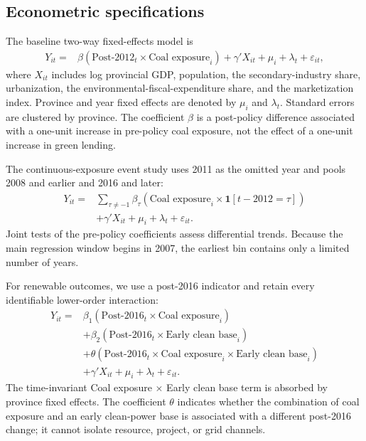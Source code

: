 \documentclass[11pt]{article}
\begin{document}
\subsection{Econometric specifications}

The baseline two-way fixed-effects model is
\begin{equation}
\begin{aligned}
Y_{it}={}&\beta(\text{Post-2012}_{t}\times\text{Coal exposure}_{i})
+\gamma'X_{it}+\mu_i+\lambda_t+\varepsilon_{it},
\end{aligned}
\label{eq:did}
\end{equation}
where $X_{it}$ includes log provincial GDP, population, the secondary-industry share, urbanization, the environmental-fiscal-expenditure share, and the marketization index. Province and year fixed effects are denoted by $\mu_i$ and $\lambda_t$. Standard errors are clustered by province. The coefficient $\beta$ is a post-policy difference associated with a one-unit increase in pre-policy coal exposure, not the effect of a one-unit increase in green lending.

The continuous-exposure event study uses 2011 as the omitted year and pools 2008 and earlier and 2016 and later:
\begin{equation}
\begin{aligned}
Y_{it}={}&\sum_{\tau\neq -1}\beta_{\tau}
\left(\text{Coal exposure}_{i}\times\mathbf{1}[t-2012=\tau]\right)\\
&+\gamma'X_{it}+\mu_i+\lambda_t+\varepsilon_{it}.
\end{aligned}
\label{eq:event}
\end{equation}
Joint tests of the pre-policy coefficients assess differential trends. Because the main regression window begins in 2007, the earliest bin contains only a limited number of years.

For renewable outcomes, we use a post-2016 indicator and retain every identifiable lower-order interaction:
\begin{equation}
\begin{aligned}
Y_{it}={}&\beta_1(\text{Post-2016}_{t}\times\text{Coal exposure}_{i})\\
&+\beta_2(\text{Post-2016}_{t}\times\text{Early clean base}_{i})\\
&+\theta(\text{Post-2016}_{t}\times\text{Coal exposure}_{i}
\times\text{Early clean base}_{i})\\
&+\gamma'X_{it}+\mu_i+\lambda_t+\varepsilon_{it}.
\end{aligned}
\label{eq:ddd}
\end{equation}
The time-invariant Coal exposure $\times$ Early clean base term is absorbed by province fixed effects. The coefficient $\theta$ indicates whether the combination of coal exposure and an early clean-power base is associated with a different post-2016 change; it cannot isolate resource, project, or grid channels.
\end{document}
